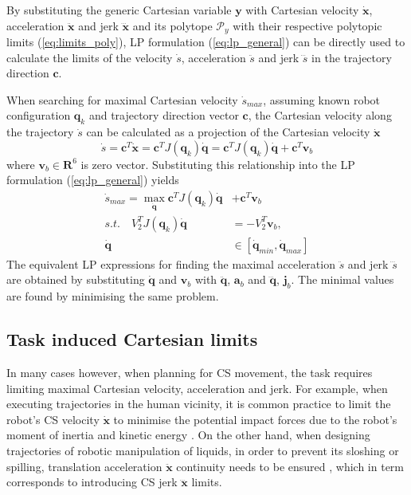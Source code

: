 

By substituting the generic Cartesian variable $\bm{y}$ with Cartesian velocity $\dot{\bm{x}}$, acceleration $\ddot{\bm{x}}$ and jerk $\dddot{\bm{x}}$ and its polytope $\mathcal{P}_y$  with their respective polytopic limits (\ref{eq:limits_poly}), LP formulation (\ref{eq:lp_general}) can be directly used to calculate the limits of the velocity $\dot{s}$, acceleration $\ddot{s}$ and jerk $\dddot{s}$ in the trajectory direction $\bm{c}$.  

When searching for maximal Cartesian velocity $\dot{s}_{max}$, assuming known robot configuration $\bm{q}_k$ and trajectory direction vector $\bm{c}$, the Cartesian velocity along the trajectory $\dot{s}$ can be calculated as a projection of the Cartesian velocity $\dot{\bm{x}}$ 
\begin{equation}
    \dot{s} = \bm{c}^T\dot{\bm{x}}= \bm{c}^TJ(\bm{q}_k)\dot{\bm{q}} = \bm{c}^TJ(\bm{q}_k)\dot{\bm{q}} + \bm{c}^T\bm{v}_b
\end{equation}
where $\bm{v}_b \in \bm{R}^6$ is zero vector. Substituting this relationship into the LP formulation (\ref{eq:lp_general}) yields 
\begin{equation}
\begin{split}
    \dot{s}_{max} = \max_{\dot{\bm{q}}} \bm{c}^TJ(\bm{q}_k)\dot{\bm{q}} &+ \bm{c}^T\bm{v}_b  \\
    s.t.\quad V_2^TJ(\bm{q}_k)\dot{\bm{q}} &= - V_2^T\bm{v}_b, \\
    \dot{\bm{q}}&\in [\dot{\bm{q}}_{min}, \dot{\bm{q}}_{max}]
\end{split}\label{eq:lp_vel_max}
\end{equation}
The equivalent LP expressions for finding the maximal acceleration $\ddot{s}$ and jerk $\dddot{s}$ are obtained by substituting $\dot{\bm{q}}$ and $\bm{v}_b$ with  $\ddot{\bm{q}}$, $\bm{a}_b$ and $\dddot{\bm{q}}$, $\bm{j}_b$. The minimal values are found by minimising the same problem.

\subsection{Task induced Cartesian limits}

In many cases however, when planning for CS movement, the task requires limiting maximal Cartesian velocity, acceleration and jerk. For example, when executing trajectories in the human vicinity, it is common practice to limit the robot's CS velocity $\dot{\bm{x}}$ to minimise the potential impact forces due to the robot's moment of inertia \cite{smu} and kinetic energy \cite{joseph2020}.
On the other hand, when designing trajectories of robotic manipulation of liquids, in order to prevent its sloshing or spilling, translation acceleration $\ddot{\bm{x}}$ continuity needs to be ensured \cite{moriello2018}, which in term corresponds to introducing CS jerk $\dddot{\bm{x}}$ limits.

